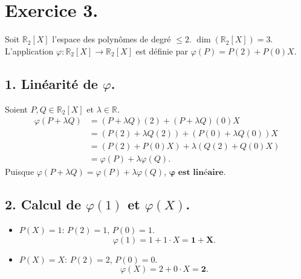 \documentclass[french]{yLectureNote}
\begin{document}
\section*{Exercice 3.}
Soit $\mathbb{R}_2[X]$ l'espace des polynômes de degré $\le 2$. $\dim(\mathbb{R}_2[X]) = 3$.
L'application $\varphi:\mathbb{R}_2[X]\to\mathbb{R}_2[X]$ est définie par $\varphi(P)=P(2)+P(0)X$.

\subsection*{1. Linéarité de $\varphi$.}
Soient $P, Q \in \mathbb{R}_2[X]$ et $\lambda \in \mathbb{R}$.
\begin{align*} \varphi(P + \lambda Q) &= (P+\lambda Q)(2) + (P+\lambda Q)(0)X \\ &= (P(2) + \lambda Q(2)) + (P(0) + \lambda Q(0))X \\ &= (P(2) + P(0)X) + \lambda (Q(2) + Q(0)X) \\ &= \varphi(P) + \lambda \varphi(Q). \end{align*}
Puisque $\varphi(P+\lambda Q) = \varphi(P) + \lambda \varphi(Q)$, $\mathbf{\varphi \text{ est linéaire}}$.

\subsection*{2. Calcul de $\varphi(1)$ et $\varphi(X)$.}
\begin{itemize}
    \item $P(X) = 1$: $P(2)=1$, $P(0)=1$.
    $$\varphi(1) = 1 + 1\cdot X = \mathbf{1+X}.$$
    \item $P(X) = X$: $P(2)=2$, $P(0)=0$.
    $$\varphi(X) = 2 + 0\cdot X = \mathbf{2}.$$
\end{itemize}
\end{document}
